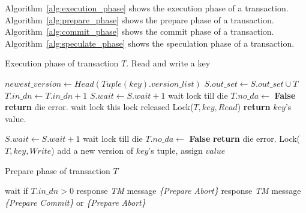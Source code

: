 \documentclass[conference]{IEEEtran}
\begin{document}
Algorithm~\ref{alg:execution_phase} shows the execution phase of a transaction. 
Algorithm~\ref{alg:prepare_phase} shows the prepare phase of a transaction. 
Algorithm~\ref{alg:commit_phase} shows the commit phase of a transaction. 
Algorithm~\ref{alg:speculate_phase} shows the speculation phase of a transaction. 
\begin{algorithm}[!h]

  \caption{Execution phase of transaction ${T}$. Read and write a key}
  
  \begin{algorithmic}[1]
      \State ${newest\_version \gets Head(Tuple(key).version\_list)}$
          \State ${S.out\_set \gets S.out\_set \cup T}$
          \State ${T.in\_dn \gets T.in\_dn + 1}$
        \EndIf 
      \EndIf
        \State ${S.wait \gets S.wait + 1}$
        \State wait lock till die
            \State ${T.no\_da \gets }$ \textbf{False}
            \State \textbf{return} die error.
        \EndIf
      \EndIf
        \State wait lock this lock released
      \EndIf
      \State Lock(${T, key, Read}$)
      \State \textbf{return} ${key}$'s value.
      \label{func:read}
  \EndFunction
  \end{algorithmic}


  \begin{algorithmic}[1]
        \State ${S.wait \gets S.wait + 1}$
      \EndIf
      \State wait lock till die
        \State ${T.no\_da \gets }$ \textbf{False}
        \State \textbf{return} die error.
      \EndIf
    \EndIf
    \State Lock(${T, key, Write}$)
    \State add a new version of ${key}$'s tuple, assign ${value}$
  \label{func:write}
  \EndFunction
  \end{algorithmic}
  \label{alg:execution_phase}
\end{algorithm}

\begin{algorithm}[!h]
  \caption{Prepare phase of transaction ${T}$}
  \begin{algorithmic}[1]
    \State wait if ${T.in\_dn > 0}$
      \State response \emph{TM} message \emph{\{Prepare Abort\}}
      \State response \emph{TM} message \emph{\{Prepare Commit\}} \newline or \emph{\{Prepare Abort\}}
    \EndIf 
  \EndFunction
  \end{algorithmic}
  \label{alg:prepare_phase}
\end{algorithm}
\end{document}
